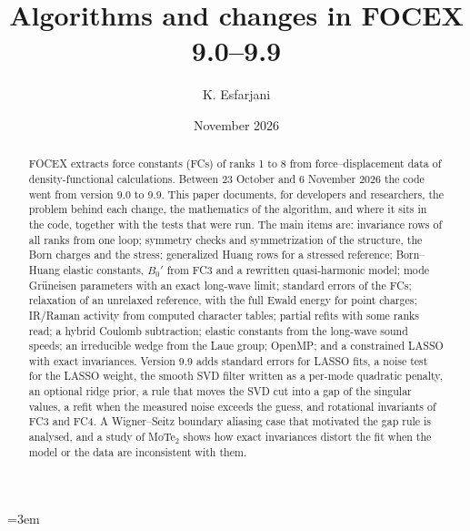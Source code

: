 \documentclass[11pt,a4paper]{article}
\title{Algorithms and changes in FOCEX 9.0--9.9}
\author{K. Esfarjani}
\date{November 2026}
\begin{document}
\sloppy
\emergencystretch=3em
\maketitle

\begin{abstract}
FOCEX extracts force constants (FCs) of ranks 1 to 8 from force--displacement data of density-functional
calculations. Between 23 October and 6 November 2026 the code went from version 9.0 to
9.9. This paper documents, for developers and researchers, the problem behind each change, the
mathematics of the algorithm, and where it sits in the code, together with the tests that were run.
The main items are: invariance rows of all ranks from one loop; symmetry checks and symmetrization of the
structure, the Born charges and the stress; generalized Huang rows for a stressed reference;
Born--Huang elastic constants, $B_0'$ from FC3 and a rewritten quasi-harmonic model; mode Gr\"uneisen
parameters with an exact long-wave limit; standard errors of the FCs; relaxation of an unrelaxed
reference, with the full Ewald energy for point charges; IR/Raman activity from computed character
tables; partial refits with some ranks read; a hybrid Coulomb subtraction; elastic constants from the
long-wave sound speeds; an irreducible wedge from the Laue group; OpenMP; and a constrained LASSO with
exact invariances. Version 9.9 adds standard errors for LASSO fits, a noise test for the LASSO weight,
the smooth SVD filter written as a per-mode quadratic penalty, an optional ridge prior, a rule that moves
the SVD cut into a gap of the singular values, a refit when the measured noise exceeds the guess, and
rotational invariants of FC3 and FC4. A Wigner--Seitz boundary aliasing case that motivated the gap rule
is analysed, and a study of MoTe$_2$ shows how exact invariances distort the fit when the model or the data
are inconsistent with them.
\end{abstract}

\tableofcontents

\end{document}

